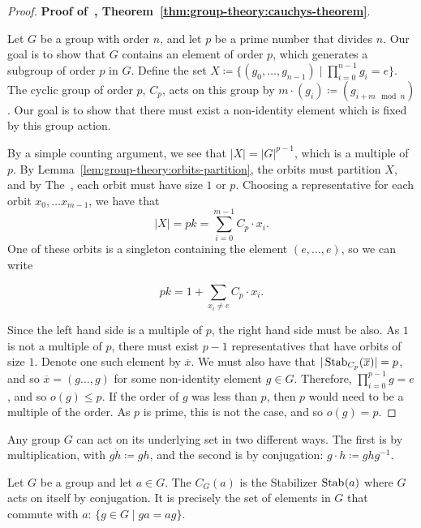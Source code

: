 \begin{proof}
  \textbf{Proof of~, Theorem~\ref{thm:group-theory:cauchys-theorem}}.

  Let \(G\) be a group with order \(n\), and let \(p\) be a prime number that divides \(n\). Our goal is to show that \(G\) contains an element of order \(p\), which generates a subgroup of order \(p\) in \(G\). Define the set \(X \coloneqq \{(g_{0}, \ldots, g_{n-1}) \mid \prod_{i=0}^{n-1}g_{i} = e\}\). The cyclic group of order \(p\), \(C_{p}\), acts on this group by \(m \cdot (g_{i}) \coloneqq (g_{i + m \mod n})\). Our goal is to show that there must exist a non-identity element which is fixed by this group action.

  By a simple counting argument, we see that \(|X| = |G|^{p-1}\), which is a multiple of \(p\). By Lemma~\ref{lem:group-theory:orbits-partition}, the orbits must partition \(X\), and by The~, each orbit must have size \(1\) or \(p\). Choosing a representative for each orbit \(x_{0}, \ldots x_{m-1}\), we have that
  \[|X| = pk = \sum_{i=0}^{m-1} C_{p} \cdot x_{i}.\]
  One of these orbits is a singleton containing the element \((e, \ldots, e)\), so we can write

  \[pk = 1 + \sum_{x_{i} \neq e} C_{p} \cdot x_{i}.\]

  Since the left hand side is a multiple of \(p\), the right hand side must be also. As \(1\) is not a multiple of \(p\), there must exist \(p-1\) representatives that have orbits of size \(1\). Denote one such element by \(\overline x\). We must also have that \(|\operatorname{Stab}_{C_{p}}(\overline x)| = p\), and so \(\overline x = (g \ldots, g)\) for some non-identity element \(g \in G\). Therefore, \(\prod_{i=0}^{p-1}g = e\), and so \(o(g) \leq p\). If the order of \(g\) was less than \(p\), then \(p\) would need to be a multiple of the order. As \(p\) is prime, this is not the case, and so \(o(g) = p\).
\end{proof}

\begin{example}
  Any group \(G\) can act on its underlying set in two different ways. The first is by multiplication, with \(g \dot h \coloneqq gh\), and the second is by conjugation: \(g \cdot h \coloneqq ghg^{-1}\).
\end{example}

\begin{definition}\label{def:group-theory:centralizer}
  Let \(G\) be a group and let \(a \in G\). The  \(C_{G}(a)\) is the Stabilizer \(\operatorname{Stab}_{}(a)\) where \(G\) acts on itself by conjugation. It is precisely the set of elements in \(G\) that commute with \(a\): \(\{g \in G \mid ga = ag\}\).
\end{definition}

